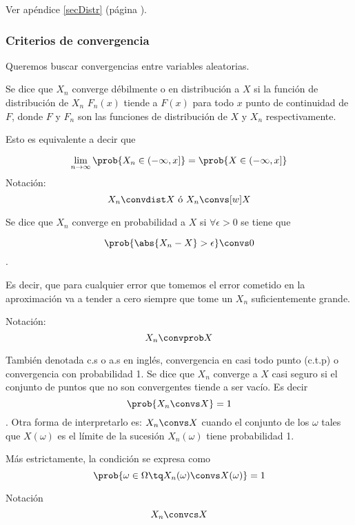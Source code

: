 \documentclass{apuntes}
\begin{document}
Ver apéndice \ref{secDistr} (página \pageref{secDistr}).

\subsubsection{Criterios de convergencia}

Queremos buscar convergencias entre variables aleatorias.

\begin{defn}

Se dice que $X_n$ converge débilmente o en distribución a $X$ si la función de distribución de $X_n$ $F_n(x)$ tiende a $F(x)$ para todo $x$ punto de continuidad de $F$, donde $F$ y $F_n$ son las funciones de distribución de $X$ y $X_n$ respectivamente.

Esto es equivalente a decir que  

\[\lim_{n\to\infty} \prob{X_n\in (-\infty, x]} = \prob{X\in (-\infty, x]} \]
Notación:
\[ X_n  \convdist X \text{ ó }  X_n \convs[w] X \] 
\end{defn}

\begin{defn} 
Se dice que $X_n$ converge en probabilidad a $X$ si $\forall \epsilon > 0$ se tiene que 

\[\prob{\abs{X_n-X} > \epsilon} \convs 0 \].

 Es decir, que para cualquier error que tomemos el error cometido en la aproximación va a tender a cero siempre que tome un $X_n$ suficientemente grande.

Notación: \[ X_n \convprob X \]
\end{defn}

\begin{defn} También denotada c.s o a.s en inglés, convergencia en casi todo punto (c.t.p) o convergencia con probabilidad 1. Se dice que $X_n$ converge a $X$ casi seguro si el conjunto de puntos que no son convergentes tiende a ser vacío. Es decir \[ \prob{X_n \convs X} = 1\]. Otra forma de interpretarlo es: $X_n \convs X$ cuando el conjunto de los $\omega$ tales que $X(\omega)$ es el límite de la sucesión $X_n(\omega)$ tiene probabilidad 1.

Más estrictamente, la condición se expresa como \[\prob{\omega \in \Omega\tq X_n(\omega) \convs X(\omega)} = 1\]

Notación \[ X_n\convcs X \]
\end{defn}
\end{document}
